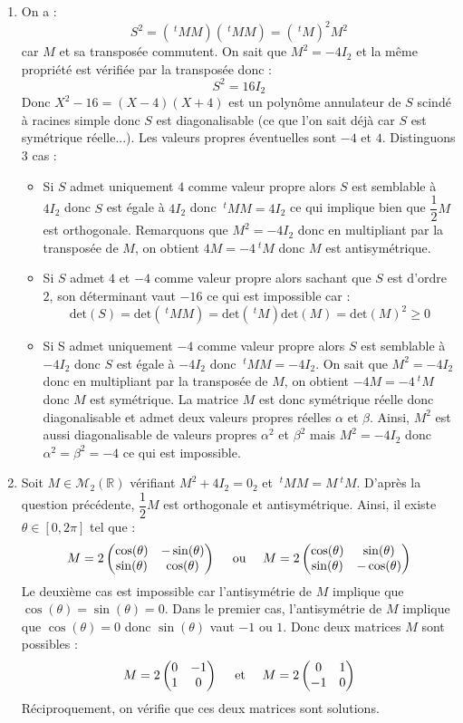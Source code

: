 \documentclass[a4paper,10pt]{report}
\begin{document}
\corr \begin{enumerate}
\item On a :
$$ S^2 = (~^tM M)(~^tM M) = (~^tM)^2 M^2$$
car $M$ et sa transposée commutent. On sait que $M^2 = -4 I_2$ et la même propriété est vérifiée par la transposée donc :
$$ S^2 = 16 I_2$$
Donc $X^2-16=(X-4)(X+4)$ est un polynôme annulateur de $S$ scindé à racines simple donc $S$ est diagonalisable (ce que l'on sait déjà car $S$ est symétrique réelle...). Les valeurs propres éventuelles sont $-4$ et $4$. Distinguons $3$ cas :
\begin{itemize}
\item Si $S$ admet uniquement $4$ comme valeur propre alors $S$ est semblable à $4I_2$ donc $S$ est égale à $4I_2$ donc $~^tM M=4I_2$ ce qui implique bien que $\dfrac{1}{2}M$ est orthogonale. Remarquons que $M^2=-4I_2$ donc en multipliant par la transposée de $M$, on obtient $4M=-4~^tM$ donc $M$ est antisymétrique.
\item Si $S$ admet $4$ et $-4$ comme valeur propre alors sachant que $S$ est d'ordre $2$, son déterminant vaut $-16$ ce qui est impossible car :
$$ \textrm{det}(S) = \textrm{det}(~^tM M) = \textrm{det}(~^tM) \textrm{det}( M)= \textrm{det}(M)^2 \geq 0$$
\item Si S admet uniquement $-4$ comme valeur propre alors $S$ est semblable à $-4I_2$ donc $S$ est égale à $-4I_2$ donc $~^tM M=-4I_2$. On sait que $M^2=-4I_2$ donc en multipliant par la transposée de $M$, on obtient $-4M=-4~^tM$ donc $M$ est symétrique. La matrice $M$ est donc symétrique réelle donc diagonalisable et admet deux valeurs propres réelles $\alpha$ et $\beta$. Ainsi, $M^2$ est aussi diagonalisable de valeurs propres $\alpha^2$ et $\beta^2$ mais $M^2= -4I_2$ donc $\alpha^2= \beta^2 = -4$ ce qui est impossible.
\end{itemize}
\item Soit $M \in \mathcal{M}_2(\mathbb{R})$ vérifiant $M^2+4I_2=0_2$ et $~^tM M = M ~^tM$. D'après la question précédente, $\dfrac{1}{2} M$ est orthogonale et antisymétrique. Ainsi, il existe $\theta \in [0,2 \pi]$ tel que :
$$ M = 2 \begin{pmatrix}
\cos(\theta) & - \sin(\theta) \\
\sin(\theta) & \cos(\theta) 
\end{pmatrix}  \quad \hbox{ ou } \quad M = 2 \begin{pmatrix}
\cos(\theta) &  \sin(\theta) \\
\sin(\theta) & -\cos(\theta) 
\end{pmatrix}$$
Le deuxième cas est impossible car l'antisymétrie de $M$ implique que $\cos(\theta) = \sin(\theta)=0$. Dans le premier cas, l'antisymétrie de $M$ implique que $\cos(\theta)=0$ donc $\sin(\theta) $ vaut $-1$ ou $1$. Donc deux matrices $M$ sont possibles :
$$ M = 2 \begin{pmatrix}
0 & -1 \\
1 & 0
\end{pmatrix} \quad \hbox{ et } \quad M =2 \begin{pmatrix}
0 & 1 \\
-1 & 0
\end{pmatrix}$$
Réciproquement, on vérifie que ces deux matrices sont solutions.
\end{enumerate}
\end{document}
